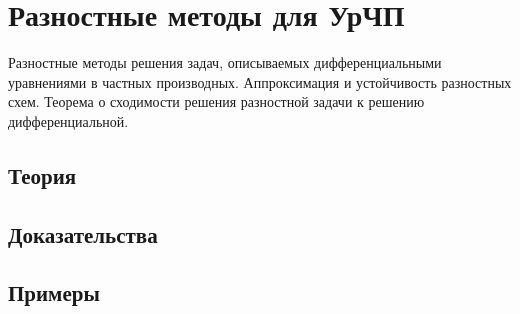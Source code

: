 
\section{Разностные методы для УрЧП}
\label{sec:2.1.12-fd-pde-general}

\begin{ticket}
Разностные методы решения задач, описываемых дифференциальными уравнениями в частных производных. Аппроксимация и устойчивость разностных схем. Теорема о сходимости решения разностной задачи к решению дифференциальной.
\end{ticket}

\subsection*{Теория}

\subsection*{Доказательства}

\subsection*{Примеры}
